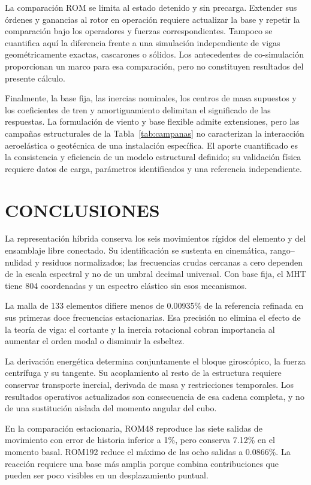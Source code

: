 \documentclass[oneside,a4paper,spanish,links,pagenumbers]{amca}
\begin{document}
La comparación ROM se limita al estado detenido y sin precarga. Extender sus órdenes y ganancias al rotor en operación requiere actualizar la base y repetir la comparación bajo los operadores y fuerzas correspondientes. Tampoco se cuantifica aquí la diferencia frente a una simulación independiente de vigas geométricamente exactas, cascarones o sólidos. Los antecedentes de co-simulación \citep{maza2014,turello2023} proporcionan un marco para esa comparación, pero no constituyen resultados del presente cálculo.

Finalmente, la base fija, las inercias nominales, los centros de masa supuestos y los coeficientes de tren y amortiguamiento delimitan el significado de las respuestas. La formulación de viento y base flexible admite extensiones, pero las campañas estructurales de la Tabla~\ref{tab:campanas} no caracterizan la interacción aeroelástica o geotécnica de una instalación específica. El aporte cuantificado es la consistencia y eficiencia de un modelo estructural definido; su validación física requiere datos de carga, parámetros identificados y una referencia independiente.

\section{CONCLUSIONES}
La representación híbrida conserva los seis movimientos rígidos del elemento y del ensamblaje libre conectado. Su identificación se sustenta en cinemática, rango--nulidad y residuos normalizados; las frecuencias crudas cercanas a cero dependen de la escala espectral y no de un umbral decimal universal. Con base fija, el MHT tiene 804 coordenadas y un espectro elástico sin esos mecanismos.

La malla de 133 elementos difiere menos de 0.00935\% de la referencia refinada en sus primeras doce frecuencias estacionarias. Esa precisión no elimina el efecto de la teoría de viga: el cortante y la inercia rotacional cobran importancia al aumentar el orden modal o disminuir la esbeltez.

La derivación energética determina conjuntamente el bloque giroscópico, la fuerza centrífuga y su tangente. Su acoplamiento al resto de la estructura requiere conservar transporte inercial, derivada de masa y restricciones temporales. Los resultados operativos actualizados son consecuencia de esa cadena completa, y no de una sustitución aislada del momento angular del cubo.

En la comparación estacionaria, ROM48 reproduce las siete salidas de movimiento con error de historia inferior a 1\%, pero conserva 7.12\% en el momento basal. ROM192 reduce el máximo de las ocho salidas a 0.0866\%. La reacción requiere una base más amplia porque combina contribuciones que pueden ser poco visibles en un desplazamiento puntual.
\end{document}
